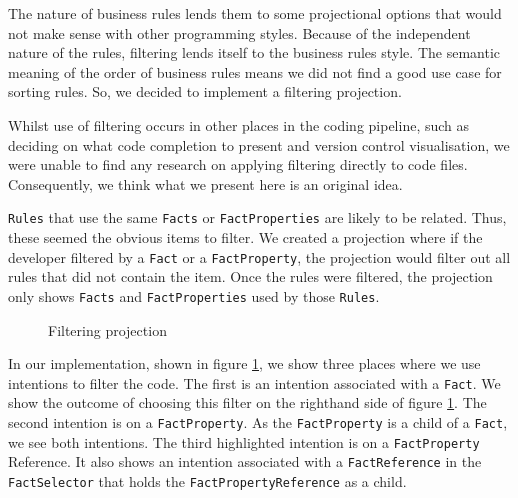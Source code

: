 The nature of business rules lends them to some projectional options that would not make sense with other programming styles.
Because of the independent nature of the rules, filtering lends itself to the business rules style.
The semantic meaning of the order of business rules means we did not find a good use case for sorting rules.
So, we decided to implement a filtering projection.

Whilst use of filtering occurs in other places in the coding pipeline, such as deciding on what code completion to present\cite{hou2010towards} and version control visualisation\cite{yoon2013visualization}, we were unable to find any research on applying filtering directly to code files.
Consequently, we think what we present here is an original idea.

\texttt{Rules} that use the same \texttt{Facts} or \texttt{FactProperties} are likely to be related.
Thus, these seemed the obvious items to filter.
We created a projection where if the developer filtered by a \texttt{Fact} or a \texttt{FactProperty}, the projection would filter out all rules that did not contain the item.
Once the rules were filtered, the projection only shows \texttt{Facts} and \texttt{FactProperties} used by those \texttt{Rules}.

\begin{figure}[h]
    \centering
    \caption{Filtering projection}
    \label{fig:filteringProjection}
\end{figure}

In our implementation, shown in figure \ref{fig:filteringProjection}, we show three places where we use intentions to filter the code.
The first is an intention associated with a \texttt{Fact}.
We show the outcome of choosing this filter on the righthand side of figure \ref{fig:filteringProjection}.
The second intention is on a \texttt{FactProperty}.
As the \texttt{FactProperty} is a child of a \texttt{Fact}, we see both intentions.
The third highlighted intention is on a \texttt{FactProperty} Reference.
It also shows an intention associated with a \texttt{FactReference} in the \texttt{FactSelector} that holds the \texttt{FactPropertyReference} as a child.


